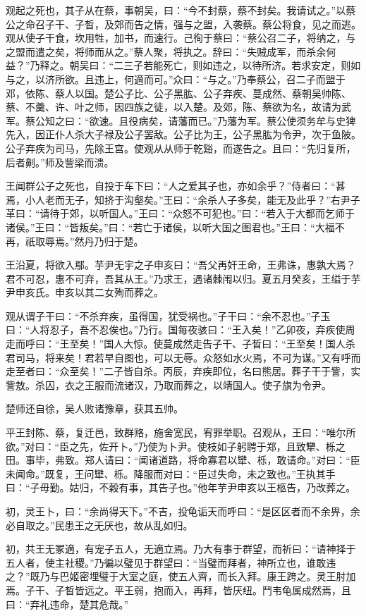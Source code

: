 \documentclass[a4paper,12pt,UTF8,twoside]{ctexbook}
\begin{document}
观起之死也，其子从在蔡，事朝吴，曰：“今不封蔡，蔡不封矣。我请试之。”以蔡公之命召子干、子晳，及郊而告之情，强与之盟，入袭蔡。蔡公将食，见之而逃。观从使子干食，坎用牲，加书，而速行。己徇于蔡曰：“蔡公召二子，将纳之，与之盟而遣之矣，将师而从之。”蔡人聚，将执之。辞曰：“失贼成军，而杀余何益？”乃释之。朝吴曰：“二三子若能死亡，则如违之，以待所济。若求安定，则如与之，以济所欲。且违上，何適而可。”众曰：“与之。”乃奉蔡公，召二子而盟于邓，依陈、蔡人以国。楚公子比、公子黑肱、公子弃疾、蔓成然、蔡朝吴帅陈、蔡、不羹、许、叶之师，因四族之徒，以入楚。及郊，陈、蔡欲为名，故请为武军。蔡公知之曰：“欲速。且役病矣，请藩而已。”乃藩为军。蔡公使须务牟与史猈先入，因正仆人杀大子禄及公子罢敌。公子比为王，公子黑肱为令尹，次于鱼陂。公子弃疾为司马，先除王宫。使观从从师于乾谿，而遂告之。且曰：“先归复所，后者劓。”师及訾梁而溃。

王闻群公子之死也，自投于车下曰：“人之爱其子也，亦如余乎？”侍者曰：“甚焉，小人老而无子，知挤于沟壑矣。”王曰：“余杀人子多矣，能无及此乎？”右尹子革曰：“请待于郊，以听国人。”王曰：“众怒不可犯也。”曰：“若入于大都而乞师于诸侯。”王曰：“皆叛矣。”曰：“若亡于诸侯，以听大国之图君也。”王曰：“大福不再，祇取辱焉。”然丹乃归于楚。

王沿夏，将欲入鄢。芋尹无宇之子申亥曰：“吾父再奸王命，王弗诛，惠孰大焉？君不可忍，惠不可弃，吾其从王。”乃求王，遇诸棘闱以归。夏五月癸亥，王缢于芋尹申亥氏。申亥以其二女殉而葬之。

观从谓子干曰：“不杀弃疾，虽得国，犹受祸也。”子干曰：“余不忍也。”子玉曰：“人将忍子，吾不忍俟也。”乃行。国每夜骇曰：“王入矣！”乙卯夜，弃疾使周走而呼曰：“王至矣！”国人大惊。使蔓成然走告子干、子晳曰：“王至矣！国人杀君司马，将来矣！君若早自图也，可以无辱。众怒如水火焉，不可为谋。”又有呼而走至者曰：“众至矣！”二子皆自杀。丙辰，弃疾即位，名曰熊居。葬子干于訾，实訾敖。杀囚，衣之王服而流诸汉，乃取而葬之，以靖国人。使子旗为令尹。

楚师还自徐，吴人败诸豫章，获其五帅。

平王封陈、蔡，复迁邑，致群赂，施舍宽民，宥罪举职。召观从，王曰：“唯尔所欲。”对曰：“臣之先，佐开卜。”乃使为卜尹。使枝如子躬聘于郑，且致犫、栎之田。事毕，弗致。郑人请曰：“闻诸道路，将命寡君以犫、栎，敢请命。”对曰：“臣未闻命。”既复，王问犫、栎。降服而对曰：“臣过失命，未之致也。”王执其手曰：“子毋勤。姑归，不穀有事，其告子也。”他年芋尹申亥以王柩告，乃改葬之。

初，灵王卜，曰：“余尚得天下。”不吉，投龟诟天而呼曰：“是区区者而不余畀，余必自取之。”民患王之无厌也，故从乱如归。

初，共王无冢適，有宠子五人，无適立焉。乃大有事于群望，而祈曰：“请神择于五人者，使主社稷。”乃徧以璧见于群望曰：“当璧而拜者，神所立也，谁敢违之？”既乃与巴姬密埋璧于大室之庭，使五人齊，而长入拜。康王跨之。灵王肘加焉。子干、子晳皆远之。平王弱，抱而入，再拜，皆厌纽。鬥韦龟属成然焉，且曰：“弃礼违命，楚其危哉。”
\end{document}

